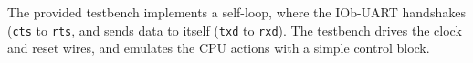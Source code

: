%

The provided testbench implements a self-loop, where the IOb-UART handshakes
({\tt cts} to {\tt rts}, and sends data to itself ({\tt txd} to {\tt rxd}). The
testbench drives the clock and reset wires, and emulates the CPU actions with
a simple control block.
